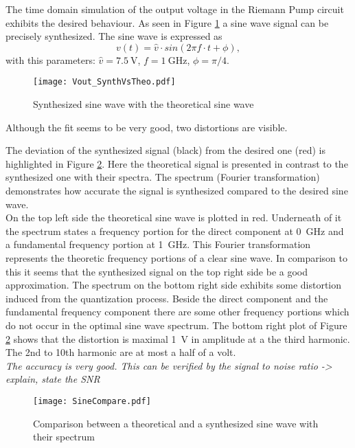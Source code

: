The time domain simulation of the output voltage in the Riemann Pump circuit exhibits the desired behaviour. 
As seen in Figure \ref{fig:SineWaveSynthVsTheoretical} a sine wave signal can be precisely synthesized. 
The sine wave is expressed as 
\begin{equation}
	v(t)= \widehat{v} \cdot sin( 2  \pi  f \cdot  t + \phi),
\end{equation}
with this parameters: $\widehat{v} = \SI{7.5}{\volt}$, $f = \SI{1}{\giga \hertz}$, $\phi = \pi / 4$.

\begin{figure}[htb!]
   \centering
   \texttt{[image: Vout\_SynthVsTheo.pdf]}
   \caption{Synthesized sine wave with the theoretical sine wave}
   \label{fig:SineWaveSynthVsTheoretical}
\end{figure}

Although the fit seems to be very good, two distortions are visible. 

The deviation of the synthesized signal (black) from the desired one (red) is highlighted in Figure \ref{fig:SineCompare}.
Here the theoretical signal is presented in contrast to the synthesized one with their spectra.
The spectrum (Fourier transformation) demonstrates how accurate the signal is synthesized compared to the desired sine wave.\\
On the top left side the theoretical sine wave is plotted in red. Underneath of it the spectrum states a frequency portion for the direct component at \SI{0} {\GHz} and a fundamental frequency portion at \SI{1}{\GHz}.
This Fourier transformation represents the theoretic frequency portions of a clear sine wave. 
In comparison to this it seems that the synthesized signal on the top right side be a good approximation.
The spectrum on the bottom right side exhibits some distortion induced from the quantization process. 
Beside the direct component and the fundamental frequency component there are some other frequency portions which do not occur in the optimal sine wave spectrum.
The bottom right plot of Figure \ref{fig:SineCompare} shows that the distortion is maximal \SI{1}{\volt} in amplitude at a the third harmonic. The 2nd to 10th harmonic are at most a half of a volt.\\
\textit{The accuracy is very good. This can be verified by the signal to noise ratio -> explain, state the SNR}

\begin{figure}[htb!]
	\centering
  \texttt{[image: SineCompare.pdf]}
	\caption{Comparison between a theoretical and a synthesized sine wave with their spectrum}
	\label{fig:SineCompare}
\end{figure}

